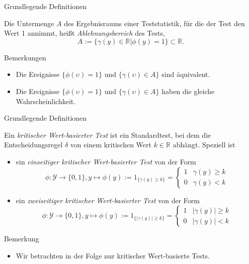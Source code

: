 \documentclass[
  8pt,
  ignorenonframetext,
]{beamer}
\providecommand{\tightlist}{%
  \setlength{\itemsep}{0pt}\setlength{\parskip}{0pt}}
\newcommand{\ups} {\upsilon}
\begin{document}
\begin{frame}{Grundlegende Definitionen}
\protect\hypertarget{grundlegende-definitionen-6}{}
\small
\begin{definition}[Ablehnungsbereich]
\justifying
Die Untermenge $A$ des Ergebnisraums einer Teststatistik, für die der Test
den Wert 1 annimmt, heißt \textit{Ablehnungsbereich} des Tests,
\begin{equation}
A := \{\gamma(y) \in \mathbb{R} |\phi(y) = 1 \} \subset \mathbb{R}.
\end{equation}
\end{definition}

Bemerkungen

\begin{itemize}
\tightlist
\item
  Die Ereignisse \(\{\phi(\ups) = 1\}\) und \(\{\gamma(\ups) \in A\}\)
  sind äquivalent.
\item
  Die Ereignisse \(\{\phi(\ups) = 1\}\) und \(\{\gamma(\ups) \in A\}\)
  haben die gleiche Wahrscheinlichkeit.
\end{itemize}
\end{frame}

\begin{frame}{Grundlegende Definitionen}
\protect\hypertarget{grundlegende-definitionen-7}{}
\small
\begin{definition}
\justifying
Ein \textit{kritischer Wert-basierter Test} ist ein Standardtest, bei dem die
Entscheidungsregel $\delta$ von einem kritischen Wert $k \in \mathbb{R}$ abhängt.
Speziell ist
\begin{itemize}
\item ein \textit{einseitiger kritischer Wert-basierter Test} von der Form
\begin{equation}
\phi : \mathcal{Y} \to \{0,1\}, y \mapsto \phi(y) := 1_{\{\gamma(y) \ge k\}} =
\begin{cases}
1 & \gamma(y) \ge k \\
0 & \gamma(y) < k
\end{cases}
\end{equation}
\item ein \textit{zweiseitiger kritischer Wert-basierter Test} von der Form
\begin{equation}
\phi : \mathcal{Y} \to \{0,1\}, y \mapsto \phi(y) := 1_{\{|\gamma(y)| \ge k\}} =
\begin{cases}
1 & |\gamma(y)| \ge k \\
0 & |\gamma(y)| < k
\end{cases}
\end{equation}
\end{itemize}
\end{definition}

Bemerkung

\begin{itemize}
\tightlist
\item
  Wir betrachten in der Folge nur kritischer Wert-basierte Tests.
\end{itemize}
\end{frame}
\end{document}
